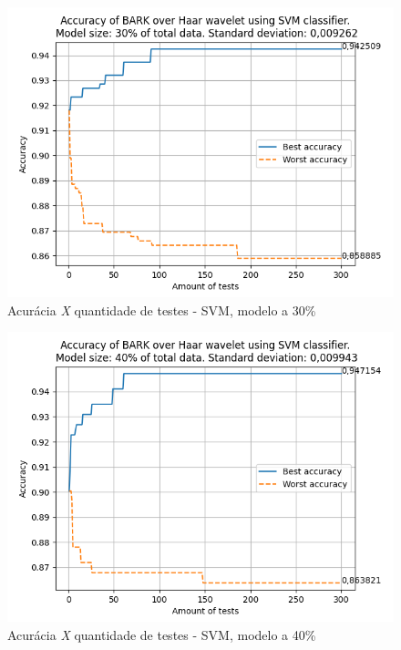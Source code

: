 			\newpage
			\begin{figure}
				\centering
				\includegraphics{images/results/confusionMatrices/classifier_SVM_30.png}
				\caption{Acurácia \textit{X} quantidade de testes - SVM, modelo a 30\%}
				\label{fig:classifiersvm30}
			\end{figure}
			
		
			\newpage
			\begin{figure}
				\centering
				\includegraphics{images/results/confusionMatrices/classifier_SVM_40.png}
				\caption{Acurácia \textit{X} quantidade de testes - SVM, modelo a 40\%}
				\label{fig:classifiersvm40}
			\end{figure}
			
		
